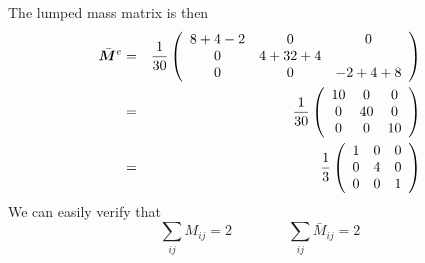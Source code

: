 The lumped mass matrix is then
\begin{eqnarray}
\bar{\bm M}^e 
&=&
\frac{1}{30}
\left(
\begin{array}{ccc}
8 + 4  -2 & 0 & 0\\
0 & 4 + 32 + 4 \\
0 & 0 & -2 + 4 + 8
\end{array}
\right) \nonumber\\
&=&
\frac{1}{30}
\left(
\begin{array}{ccc}
10 & 0 & 0\\
0 & 40 & 0\\
0 & 0 & 10 
\end{array}
\right) \nonumber\\
&=&
\frac{1}{3}
\left(
\begin{array}{ccc}
1 & 0 & 0\\
0 & 4 & 0\\
0 & 0 & 1 
\end{array}
\right) 
\end{eqnarray}
We can easily verify that
\[
\sum_{ij} M_{ij} = 2
\qquad
\qquad
\sum_{ij} \bar{M}_{ij} = 2
\]


